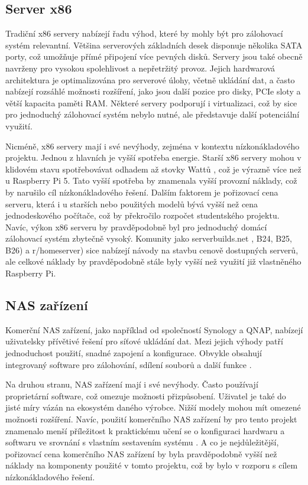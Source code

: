 \documentclass[a4paper,12pt, oneside]{book}
\begin{document}
\subsection{Server x86}
Tradiční x86 servery nabízejí řadu výhod, které by mohly být pro zálohovací
systém relevantní. Většina serverových základních desek disponuje několika SATA
porty, což umožňuje přímé připojení více pevných disků. Servery jsou také obecně
navrženy pro vysokou spolehlivost a nepřetržitý provoz. Jejich hardwarová
architektura je optimalizována pro serverové úlohy, včetně ukládání dat, a často
nabízejí rozsáhlé možnosti rozšíření, jako jsou další pozice pro disky, PCIe
sloty a větší kapacita paměti RAM. Některé servery podporují i virtualizaci, což
by sice pro jednoduchý zálohovací systém nebylo nutné, ale představuje další
potenciální využití.

Nicméně, x86 servery mají i své nevýhody, zejména v kontextu nízkonákladového
projektu. Jednou z hlavních je vyšší spotřeba energie. Starší x86 servery mohou
v klidovém stavu spotřebovávat odhadem až stovky Wattů , což je výrazně více
než u Raspberry Pi 5. Tato vyšší spotřeba by znamenala vyšší provozní náklady,
což by narušilo cíl nízkonákladového řešení. Dalším faktorem je
pořizovací cena serveru, která i u starších nebo použitých modelů bývá vyšší než
cena jednodeskového počítače, což by překročilo rozpočet studentského projektu.
Navíc, výkon x86 serveru by
pravděpodobně byl pro jednoduchý domácí zálohovací systém zbytečně vysoký.
Komunity jako serverbuilds.net , B24, B25, B26) a r/homeserver)
sice nabízejí návody na stavbu cenově dostupných serverů, ale celkové náklady by
pravděpodobně stále byly vyšší než využití již vlastněného Raspberry Pi.  

\subsection{NAS zařízení}

Komerční NAS zařízení, jako například od společností Synology a QNAP, nabízejí
uživatelsky přívětivé řešení pro síťové ukládání dat. Mezi jejich výhody patří
jednoduchost použití, snadné zapojení a konfigurace. Obvykle obsahují
integrovaný software pro zálohování, sdílení souborů a další funkce .  

Na druhou stranu, NAS zařízení mají i své nevýhody. Často používají proprietární
software, což omezuje možnosti přizpůsobení. Uživatel je také do jisté míry
vázán na ekosystém daného výrobce. Nižší modely mohou mít omezené možnosti
rozšíření. Navíc, použití komerčního NAS zařízení by pro tento projekt znamenalo
menší příležitost k praktickému učení se o konfiguraci hardwaru a softwaru ve
srovnání s vlastním sestavením systému . A co je nejdůležitější, pořizovací cena
komerčního NAS zařízení by byla pravděpodobně vyšší než náklady na komponenty
použité v tomto projektu, což by bylo v rozporu s cílem nízkonákladového řešení.  
\end{document}
